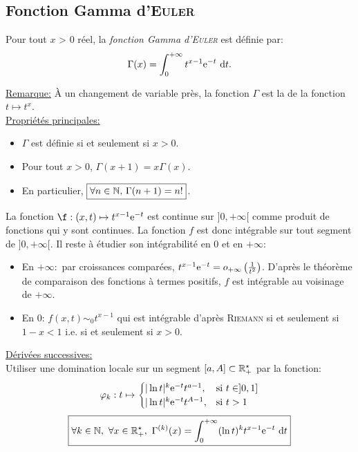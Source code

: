 \subsection{Fonction Gamma d'\textsc{Euler}}
\begin{tcolorbox}
    Pour tout $x$ > 0 réel, la \emph{fonction Gamma d'\textsc{Euler}} est définie par: 
    $$\Gamma(x) = \int_{0}^{+\infty} t^{x-1} \me^{-t}\ \d t.$$
\end{tcolorbox}


\begin{marginfigure}[2.5cm]
    
    \caption{Graphe de la fonction Gamma}
\end{marginfigure}

\underline{Remarque:} À un changement de variable près, la fonction $\Gamma$ est la  de la fonction $t \mapsto t^x$. \\
\underline{Propriétés principales:}
\begin{itemize}
    \item $\Gamma$ est définie si et seulement si $x>0$.
    \item Pour tout $x > 0$, $\Gamma(x+1) = x\Gamma(x)$.
    \item En particulier, $\boxed{\forall n \in \mathbb{N}$, $\Gamma(n+1) = n!}$. 
\end{itemize}
\begin{preuve}
    La fonction $\f:(x,t) \mapsto t^{x-1} \me^{-t}$ est continue sur $]0, + \infty[$ comme produit de fonctions qui y sont continues. La fonction $f$ est donc intégrable sur tout segment de $]0, +\infty[$. Il reste à étudier son intégrabilité en $0$ et en $+ \infty$:
    \begin{itemize}
        \item En $+\infty:$ par croissances comparées, $t^{x-1} \mathrm{e}^{-t} = o_{+\infty} \left(\frac{1}{t^2} \right)$. D'après le théorème de comparaison des fonctions à termes positifs, $f$ est intégrable au voisinage de $+\infty$.
        \item En $0$: $f(x,t) \sim_0 t^{x-1}$ qui est intégrable d'après \textsc{Riemann} si et seulement si $1-x < 1$ i.e. si et seulement si $\boxed{x > 0}$.
    \end{itemize}
\end{preuve}
\underline{Dérivées successives:} \\
Utiliser une domination locale sur un segment $[a, A] \subset \mathbb{R}_+^\star$ par la fonction:
$$\varphi_k:t \mapsto 
\begin{cases}
    |\ln t |^k \mathrm{e}^{-t} t^{a-1}, & \text{si } t \in ]0, 1] \\
    |\ln t |^k \mathrm{e}^{-t} t^{A-1}, & \text{si } t > 1
\end{cases}
$$
$$\boxed{\forall k \in \mathbb{N},\ \forall x \in \mathbb{R}_+^\star,\ \Gamma^{(k)}(x) = \int_{0}^{+\infty} (\ln t)^k t^{x-1} \mathrm{e}^{-t}\ \mathrm{d} t}$$

